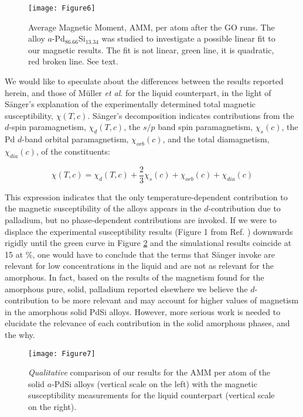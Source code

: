 \documentclass[fleqn,12pt]{wlscirep}
\begin{document}
\begin{figure}[H]
\centering
\texttt{[image: Figure6]}
\caption{Average Magnetic Moment, AMM, per atom after the GO runs. The alloy $a$-Pd$_{86.66}$Si$_{13.34}$ was studied to investigate a possible linear fit to our magnetic results. The fit is not linear, green line, it is quadratic, red broken line. See text.}
\label{fig:Fig6}
\end{figure}

\pagebreak

We would like to speculate about the differences between the results reported herein, and those of M\"{u}ller \textit{et al}. \cite{Muller_1978} for the liquid counterpart, in the light of S\"{a}nger's explanation \cite{Sanger_1984} of the experimentally determined total magnetic susceptibility, $\chi(T,c)$. S\"{a}nger’s decomposition indicates contributions from the $d$-spin paramagnetism, $\chi_{d} (T,c)$, the $s/p$ band spin paramagnetism, $\chi_{s} (c)$, the Pd $d$-band orbital paramagnetism, $\chi_{orb} (c)$, and the total diamagnetism, $\chi_{dia} (c)$, of the constituents:

\begin{equation*}
\chi(T,c) = \chi_{d} (T,c) + \dfrac{2}{3} \chi_{s} (c) + \chi_{orb} (c) + \chi_{dia} (c)
\end{equation*}

This expression indicates that the only temperature-dependent contribution to the magnetic susceptibility of the alloys appears in the $d$-contribution due to palladium, but no phase-dependent contributions are invoked.  If we were to displace the experimental susceptibility results (Figure 1 from Ref. \cite{Sanger_1984}) downwards rigidly until the green curve in Figure \ref{fig:Fig7} and the simulational results coincide at 15 at \%, one would have to conclude that the terms that S\"{a}nger invoke are relevant for low concentrations in the liquid and are not as relevant for the amorphous. In fact, based on the results of the magnetism found for the amorphous pure, solid, palladium reported elsewhere \cite{Rodriguez_2019} we believe the $d$-contribution to be more relevant and may account for higher values of magnetism in the amorphous solid PdSi alloys. However, more serious work is needed to elucidate the relevance of each contribution in the solid amorphous phases, and the why.

\begin{figure}[H]
\centering
\texttt{[image: Figure7]}
\caption{\textit{Qualitative} comparison of our results for the AMM per atom of the solid $a$-PdSi alloys (vertical scale on the left) with the magnetic susceptibility measurements for the liquid counterpart (vertical scale on the right).}
\label{fig:Fig7}
\end{figure}
\end{document}
